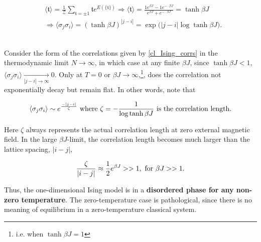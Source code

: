 \documentclass{homework}
\begin{document}
\begin{equation}
\begin{split}
    &\langle \mathfrak{t} \rangle = \frac{1}{\mathcal{Z}}\sum_{\mathfrak{t} =  \pm 1} \mathfrak{t} e^{E(\{\mathfrak{t}\})} \Rightarrow \langle \mathfrak{t} \rangle  = \frac{1 e^{\beta J} - 1 e^{-\cdot \beta J}}{e^{\beta J} +  e^{-\cdot \beta J}} = \tanh \beta J \\
    &\Rightarrow \langle \sigma_j \sigma_i \rangle = (\tanh \beta J)^{|j-i|} = \exp \bigg(|j-i| \log \tanh \beta J\bigg).
    \label{cl_Ising_corrs}
\end{split}
\end{equation}

\blanky \\

Consider the form of the correlations given by \cref{cl_Ising_corrs} in the thermodynamic limit $N \rightarrow \infty$, in which case at any finite $\beta J$, since $\tanh \beta J < 1$, $\langle \sigma_j \sigma_i \rangle  \underset{|j-i| \rightarrow \infty}{\longrightarrow} 0$. Only at $T=0$ or $\beta J \rightarrow \infty$,\footnote{i.e.  when $\tanh \beta J = 1$}, does the correlation not exponentially decay but remain flat. In other words, note that 

\begin{equation}
    \langle \sigma_j \sigma_i \rangle \sim e^{\frac{-|j-i|}{\zeta}} \textnormal{ where } \zeta = -\frac{1}{\log \tanh \beta J} \textnormal{ is the correlation length.}
\end{equation}

Here $\zeta$ always represents the actual correlation length at zero external magnetic field. In the large $\beta J$-limit, the correlation length becomes much larger than the lattice spacing, $|i-j|$,

\begin{equation}
    \frac{\zeta}{|i-j|} \approx \frac{1}{2} e^{\beta J} >> 1, \textnormal{ for } \beta J >> 1.
    \label{cl_Ising_relation_corr_betaJ}
\end{equation}

Thus, the one-dimensional Ising model is in a \textbf{disordered phase for any non-zero temperature}. The zero-temperature case is pathological, since there is no meaning of equilibrium in a zero-temperature classical system. 
\\
\end{document}
